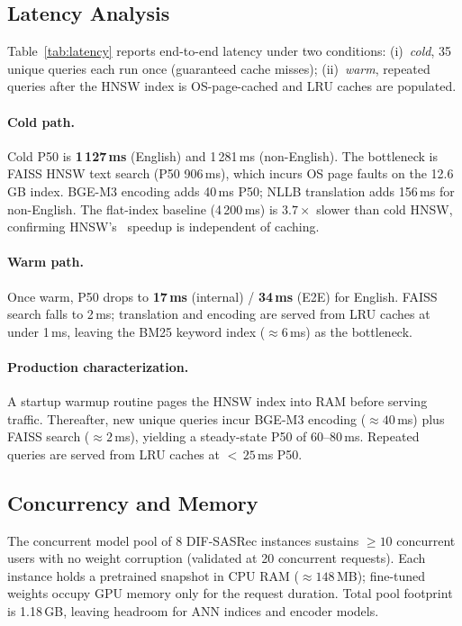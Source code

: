 \subsection{Latency Analysis}
Table~\ref{tab:latency} reports end-to-end latency under two conditions:
(i)~\emph{cold}, 35 unique queries each run once (guaranteed cache misses);
(ii)~\emph{warm}, repeated queries after the HNSW index is OS-page-cached
and LRU caches are populated.



\paragraph{Cold path.}
Cold P50 is \textbf{1\,127\,ms} (English) and 1\,281\,ms (non-English).
The bottleneck is FAISS HNSW text search (P50 906\,ms), which incurs OS
page faults on the 12.6\,GB index. BGE-M3 encoding adds 40\,ms P50;
NLLB translation adds 156\,ms for non-English.
The flat-index baseline (4\,200\,ms) is $3.7\times$ slower than cold HNSW,
confirming HNSW's~\cite{malkov2018efficient} speedup is independent of caching.

\paragraph{Warm path.}
Once warm, P50 drops to \textbf{17\,ms} (internal) / \textbf{34\,ms}
(E2E) for English. FAISS search falls to 2\,ms; translation and encoding
are served from LRU caches at under 1\,ms, leaving the BM25 keyword index
(${\approx}6$\,ms) as the bottleneck.

\paragraph{Production characterization.}
A startup warmup routine pages the HNSW index into RAM before serving
traffic. Thereafter, new unique queries incur BGE-M3 encoding (${\approx}40$\,ms)
plus FAISS search (${\approx}2$\,ms), yielding a steady-state P50 of 60--80\,ms.
Repeated queries are served from LRU caches at ${<}\,25$\,ms P50.

\subsection{Concurrency and Memory}
The concurrent model pool of 8 DIF-SASRec instances sustains ${\geq}10$ concurrent users
with no weight corruption (validated at 20 concurrent requests).
Each instance holds a pretrained snapshot in CPU RAM (${\approx}148$\,MB);
fine-tuned weights occupy GPU memory only for the request duration.
Total pool footprint is 1.18\,GB, leaving headroom for ANN indices
and encoder models.

